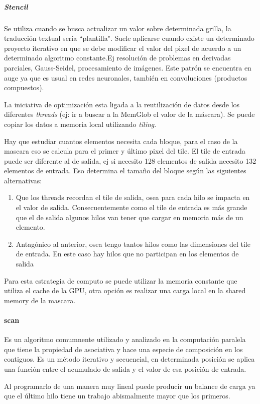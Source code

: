 \documentclass[]{scrartcl}
\begin{document}
\subparagraph{Stencil}
Se utiliza cuando se busca actualizar un valor sobre determinada grilla, la traducción textual sería ``plantilla". Suele aplicarse cuando existe un determinado proyecto iterativo en que se debe modificar el valor del pixel de acuerdo a un determinado algoritmo constante.Ej resolución de problemas en derivadas parciales, Gauss-Seidel, procesamiento de imágenes. Este patrón se encuentra en auge ya que es usual en redes neuronales, también en convoluciones (productos compuestos). 

La iniciativa de optimización esta ligada a la reutilización de datos desde  los diferentes \emph{threads} (ej: ir a buscar a la MemGlob el valor de la máscara). Se puede copiar los datos a memoria local utilizando \emph{tiling}.

Hay que estudiar cuantos elementos necesita cada bloque, para el caso de la mascara eso se calcula para el primer y último pixel del tile. El tile de entrada puede ser diferente al de salida, ej si necesito 128 elementos de salida necesito 132 elementos de entrada. Eso determina el tamaño del bloque según las siguientes alternativas:
\begin{enumerate}
	\item Que los threads recordan el tile de salida, osea para cada hilo se impacta en el valor de salida. Consecuentemente como el tile de entrada es más grande que el de salida algunos hilos van tener que cargar en memoria más de un elemento.
	\item Antagónico al anterior, osea tengo tantos hilos como las dimensiones del tile de entrada. En este caso hay hilos que no participan en los elementos de salida
\end{enumerate}  

Para esta estrategia de computo se puede utilizar la memoria constante que utiliza el cache de la GPU, otra opción es realizar una carga local en la shared memory de la mascara. 

\paragraph{scan}
Es un algoritmo comumnente utilizado y analizado en la computación paralela que tiene la propiedad de asociativa y hace una especie de composición en los contiguos. Es un método iterativo y secuencial, en determinada posición se aplica una función entre el acumulado de salida y el valor de esa posición de entrada. 

Al programarlo de una manera muy lineal puede producir un balance de carga ya que el último hilo tiene un trabajo abismalmente mayor que los primeros.
\end{document}
